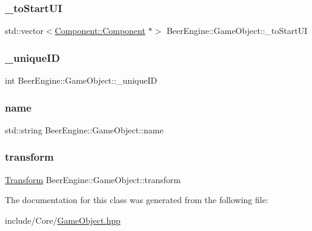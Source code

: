 \subsubsection{\texorpdfstring{\+\_\+to\+Start\+UI}{\_toStartUI}}
{\footnotesize\ttfamily std\+::vector$<$\mbox{\hyperlink{class_beer_engine_1_1_component_1_1_component}{Component\+::\+Component}} $\ast$$>$ Beer\+Engine\+::\+Game\+Object\+::\+\_\+to\+Start\+UI\hspace{0.3cm}{\ttfamily [protected]}}

\mbox{\label{class_beer_engine_1_1_game_object_a7520a234dc0f49d03deac22a6d4b8e19}} 
\subsubsection{\texorpdfstring{\+\_\+unique\+ID}{\_uniqueID}}
{\footnotesize\ttfamily int Beer\+Engine\+::\+Game\+Object\+::\+\_\+unique\+ID}

\mbox{\label{class_beer_engine_1_1_game_object_a14a6872777d4a7be2c967a0169a7880a}} 
\subsubsection{\texorpdfstring{name}{name}}
{\footnotesize\ttfamily std\+::string Beer\+Engine\+::\+Game\+Object\+::name}

\mbox{\label{class_beer_engine_1_1_game_object_ac17bf13885d36b7ae8b1164e1ec13a02}} 
\subsubsection{\texorpdfstring{transform}{transform}}
{\footnotesize\ttfamily \mbox{\hyperlink{class_beer_engine_1_1_transform}{Transform}} Beer\+Engine\+::\+Game\+Object\+::transform}



The documentation for this class was generated from the following file\+:\begin{DoxyCompactItemize}
\item 
include/\+Core/\mbox{\hyperlink{_game_object_8hpp}{Game\+Object.\+hpp}}\end{DoxyCompactItemize}
